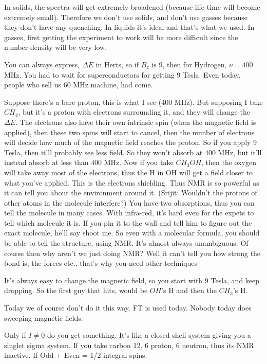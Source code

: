		In solids, the spectra will get extremely broadened (because life time will become extremely small). Therefore we don't use solids, and don't use gasses because they don't have any quenching. In liquids it's ideal and that's what we used. In gasses, first getting the experiment to work will be more difficult since the number density will be very low.
		\par
		You can always express, $\Delta E$ in Herts, so if $B_z$ is 9, then for Hydrogen, $\nu=400$ MHz. You had to wait for superconductors for getting 9 Tesla. Even today, people who sell us 60 MHz machine, had come.
		\par
		Suppose there's a bare proton, this is what I see (400 MHz). But supposing I take $CH_4$, but it's a proton with electrons surrounding it, and they will change the $\Delta E$. The electrons also have their own intrinsic spin (when the magnetic field is applied), then these two spins will start to cancel, then the number of electrons will decide how much of the magnetic field reaches the proton. So if you apply 9 Tesla, then it'll probably see less field. So they won't absorb at 400 MHz, but it'll instead absorb at less than 400 MHz. Now if you take $CH_3OH$, then the oxygen will take away most of the electrons, thus the H in OH will get a field closer to what you've applied. This is the electrons shielding. Thus NMR is so powerful as it can tell you about the environment around it.
		(Srijit: Wouldn't the protons of other atoms in the molecule interfere?)
		You have two absorptions, thus you can tell the molecule in many cases. With infra-red, it's hard even for the expets to tell which molecule it is. If you pin it to the wall and tell him to figure out the exact molecule, he'll say shoot me.
		So even with a molecular formula, you should be able to tell the structure, using NMR. It's almost always unambiguous. Of course then why aren't we just doing NMR? Well it can't tell you how strong the bond is, the forces etc., that's why you need other techniques

		It's always easy to change the magnetic field, so you start with 9 Tesla, and keep dropping. So the first guy that hits, would be $OH$'s H and then the $CH_3$'s H.		

		Today we of course don't do it this way. FT is used today. Nobody today does sweeping magnetic fields.

		Only if $I\neq0$ do you get something. It's like a closed shell system giving you a singlet sigma system. If you take carbon 12, 6 proton, 6 neutron, thus its NMR inactive. If Odd + Even = 1/2 integral spins.

	